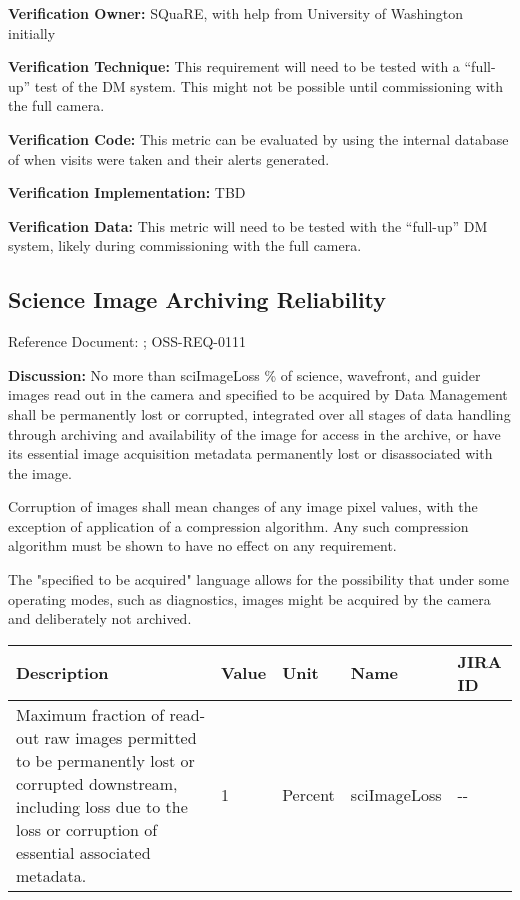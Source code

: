 \documentclass[DM,lsstdraft,toc]{lsstdoc}
\begin{document}
\textbf{Verification Owner:} SQuaRE, with help from University of
Washington initially

\textbf{Verification Technique:} This requirement will need to be tested
with a ``full-up'' test of the DM system. This might not be possible
until commissioning with the full camera.

\textbf{Verification Code:} This metric can be evaluated by using the
internal database of when visits were taken and their alerts generated.

\textbf{Verification Implementation:} TBD

\textbf{Verification Data:} This metric will need to be tested with the
``full-up'' DM system, likely during commissioning with the full camera.

\subsection{Science Image Archiving
Reliability}\label{science-image-archiving-reliability}

Reference Document: ; OSS-REQ-0111

\textbf{Discussion:} No more than sciImageLoss \% of science, wavefront,
and guider images read out in the camera and specified to be acquired by
Data Management shall be permanently lost or corrupted, integrated over
all stages of data handling through archiving and availability of the
image for access in the archive, or have its essential image acquisition
metadata permanently lost or disassociated with the image.

Corruption of images shall mean changes of any image pixel values, with
the exception of application of a compression algorithm. Any such
compression algorithm must be shown to have no effect on any \SRD
requirement.

The "specified to be acquired" language allows for the possibility that
under some operating modes, such as diagnostics, images might be
acquired by the camera and deliberately not archived.

\begin{longtable}[]{@{}p{}llll@{}}
\toprule
Description & Value & Unit & Name & JIRA ID\tabularnewline
\midrule
\endhead
Maximum fraction of read-out raw images permitted to be permanently lost
or corrupted downstream, including loss due to the loss or corruption of
essential associated metadata. & 1 & Percent & sciImageLoss &
-\/-\tabularnewline
\bottomrule
\end{longtable}
\end{document}
